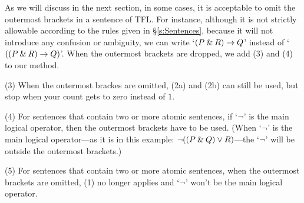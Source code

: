 As we will discuss in the next section, in some cases, it is acceptable to omit the outermost brackets in a sentence of TFL. For instance, although it is not strictly allowable according to the rules given in \S\ref{s:Sentences}, because it will not introduce any confusion or ambiguity, we can write `$(P \mathbin{\&} R) \rightarrow Q$' instead of `$((P \mathbin{\&} R) \rightarrow Q)$'. When the outermost brackets are dropped, we add (3) and (4) to our method.

\begin{ebullet}
\item[(3)] When the outermost brackes are omitted, (2a) and (2b) can still be used, but stop when your count gets to zero instead of $1$.
\item[(4)] For sentences that contain two or more atomic sentences, if `${\neg}$' is the main logical operator, then the outermost brackets have to be used. (When `${\neg}$' is the main logical operator---as it is in this example: ${\neg}((P \mathbin{\&} Q) \vee R)$---the `${\neg}$' will be outside the outermost brackets.) 
\item[(5)] For sentences that contain two or more atomic sentences, when the outermost brackets are omitted, (1) no longer applies and `${\neg}$' won't be the main logical operator. 
\end{ebullet}

